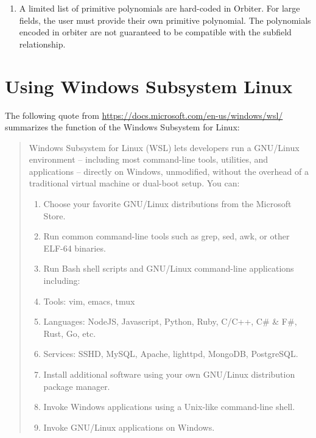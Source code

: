 \begin{enumerate}
\item
A limited list of primitive polynomials are hard-coded in Orbiter. For large fields, the user must provide their own primitive polynomial.
The polynomials encoded in orbiter are not guaranteed to be compatible with the subfield relationship.
\end{enumerate}
\section{Using Windows Subsystem Linux}






\bigskip

\clearpage



The following quote from \url{https://docs.microsoft.com/en-us/windows/wsl/} 
summarizes the function of the Windows Subsystem for Linux:
\begin{quote}
Windows Subsystem for Linux (WSL) lets developers run a GNU/Linux environment -- 
including most command-line tools, utilities, and applications -- 
directly on Windows, unmodified, 
without the overhead of a traditional virtual machine or dual-boot setup.
You can:
\begin{enumerate}
\item
Choose your favorite GNU/Linux distributions from the Microsoft Store.
\item
Run common command-line tools such as grep, sed, awk, or other ELF-64 binaries.
\item
Run Bash shell scripts and GNU/Linux command-line applications including:
\item
Tools: vim, emacs, tmux
\item
Languages: NodeJS, Javascript, Python, Ruby, C/C++, C\# \& F\#, Rust, Go, etc.
\item
Services: SSHD, MySQL, Apache, lighttpd, MongoDB, PostgreSQL.
\item
Install additional software using your own GNU/Linux distribution package manager.
\item
Invoke Windows applications using a Unix-like command-line shell.
\item
Invoke GNU/Linux applications on Windows.
\end{enumerate}
\end{quote}

